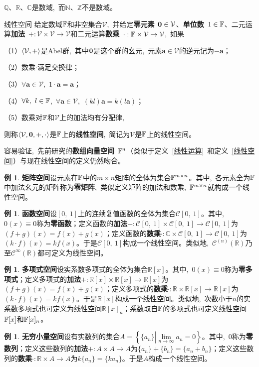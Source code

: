 \documentclass[10pt, a4paper, oneside, fontset=none]{ctexart}
\theoremstyle{plain}
\theoremstyle{definition}
\newtheorem{example}[theorem]{例}
\newcommand{\com}{,\,\,\,\:}
\newcommand{\den}[2][]{\begin{defi}{#1}\kai #2\end{defi}}
\newcommand{\R}{\mathbb{R}}
\newcommand{\C}{\mathbb{C}}
\newcommand{\tboba}[1]{\textbf{\kai\color{bali!75!black}#1}}
\begin{document}
$\mathbb{Q}$、$\mathbb{R}$、$\mathbb{C}$是数域\com 而$\mathbb{N}$、$\mathbb{Z}$不是数域。

\newcommand{\V}{\mathcal{V}}
\den[线性空间]{
	给定数域$\mathbb{F}$和非空集合$\V$\com 并给定\tboba{零元素}~$\0 \in \V$、\tboba{单位数}~$1 \in \mathbb{F}$、二元运算\tboba{加法}~$+:\V \times \V \to \V$和二元运算\tboba{数乘}~$\cdot:\bF \times \V \to \V$\com 如果

	（1）$\a{\V,+}$是Abel群\com 其中$\boldsymbol{0}$是这个群的幺元\com 元素$\boldsymbol{a}\in \V$的逆元记为$-\boldsymbol{a}$；

	（2）数乘$\cdot$满足交换律；

	（3）$\forall \boldsymbol{a} \in \V$\com $1 \cdot \boldsymbol{a}=\boldsymbol{a}$；

	（4）$\forall k,~l \in \mathbb{F}$\com $\forall \boldsymbol{a} \in \V$\com $(kl)\boldsymbol{a}=k(l\boldsymbol{a})$；

	（5）数乘对$\mathbb{F}$和$\V$上的加法均有分配律\com 

	则称$\a{\V,\boldsymbol{0},+,\cdot}$是$\mathbb{F}$上的\tboba{线性空间}\com 简记为$\V$是$\mathbb{F}$上的线性空间。
}
容易验证\com 先前研究的\tboba{数组向量空间}~$\mathbb{F}^n$（类似于定义~\ref{线性运算}~和定义~\ref{线性空间}）与现在线性空间的定义仍然吻合。
\begin{example}
	\textbf{矩阵空间}\quad\label{矩阵空间}
	设元素在$\mathbb{F}$中的$m \times n$矩阵的全体为集合$\mathbb{F}^{m \times n}$。其中\com 各元素全为$\mathbb{F}$中加法幺元的矩阵称为\textbf{零矩阵}\com 类似定义矩阵的加法和数乘\com $\mathbb{F}^{m \times n}$就构成一个线性空间。
\end{example}
\begin{example}
	\textbf{函数空间}\quad\label{函数空间} 
	设$[0,~1]$上的连续复值函数的全体为集合$\mathscr{C}[0,~1]$。其中\com $0(x) \equiv 0$称为\textbf{零函数}；定义函数的\textbf{加法}$+:\mathscr{C}[0,~1] \times \mathscr{C}[0,~1] \to \mathscr{C}[0,~1]$为$(f+g)(x)=f(x)+g(x)$；定义函数的\textbf{数乘}$\cdot:\C \times \mathscr{C}[0,~1] \to \mathscr{C}[0,~1]$为$(k \cdot f)(x)=kf(x)$。于是$\mathscr{C}[0,~1]$构成一个线性空间。类似地\com $\mathscr{C}^{(n)}(\R)$乃至$\mathscr{C}^{\infty}(\R)$都可定义为线性空间。
\end{example}
\begin{example}
	\textbf{多项式空间}\quad\label{多项式空间} 
	设实系数多项式的全体为集合$\R[x]$。其中\com $0(x) \equiv 0$称为\textbf{零多项式}；定义多项式的\textbf{加法}$+:\R[x] \times \R[x] \to \R[x]$为$(f+g)(x)=f(x)+g(x)$；定义多项式的\textbf{数乘}$\cdot:\R \times \R[x] \to \R[x]$为$(k \cdot f)(x)=kf(x)$。于是$\R[x]$构成一个线性空间。类似地\com 次数小于$n$的实系数多项式也可定义为线性空间$\R[x]_n$；系数取自$\mathbb{F}$的多项式也可定义线性空间$\mathbb{F}[x]$和$\mathbb{F}[x]_n$。
\end{example}
\begin{example}
	\textbf{无穷小量空间}\quad\label{无穷小量空间} 
	设有实数列的集合$A=\left\{\{a_n\}\left|\lim\limits_{n\to \infty}a_n = 0\right.\right\}$。其中\com $0$称为\textbf{零数列}；定义这些数列的\textbf{加法}$+: A \times A \to A$为$\{a_n\}+\{b_n\}=\{a_n+b_n\}$；定义这些数列的\textbf{数乘}$\cdot:\R \times A \to A$为$k\{a_n\}=\{ka_n\}$。于是$A$构成一个线性空间。
\end{example}
\end{document}
